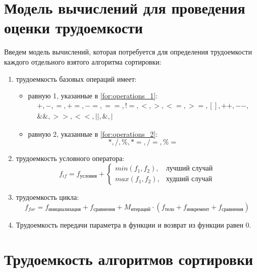 \section{Модель вычислений для проведения оценки трудоемкости}

Введем модель вычислений, которая потребуется для определения трудоемкости каждого отдельного взятого алгоритма сортировки:
\begin{enumerate}
	\item трудоемкость базовых операций имеет:
		\begin{itemize}
			\item равную 1, указанные в \ref{for:operations_1}:
			\begin{equation}
				\label{for:operations_1}
				\begin{aligned}
					+, -, =, +=, -=, ==, !=, <, >, <=, >=, [], ++, {-}-,\\
					\&\&, >>, <<, ||, \&, |
				\end{aligned}
			\end{equation}
			\item равную 2, указанные в \ref{for:operations_2}:
			\begin{equation}
				\label{for:operations_2}
				*, /, \%, *=, /=, \%=
			\end{equation}
		\end{itemize}
	\item трудоемкость условного оператора:
		\begin{equation}
			\label{for:if}
			f_{if} = f_{\text{условия}} + 
			\begin{cases}
				min(f_1, f_2), & \text{лучший случай}\\
				max(f_1, f_2), & \text{худший случай}
			\end{cases}
		\end{equation}
	\item трудоемкость цикла:
		\begin{equation}
			\label{for:for}
			f_{for} = f_{\text{инициализация}} + f_{\text{сравнения}} + M_{\text{итераций}} \cdot (f_{\text{тело}} + f_{\text{инкремент}} + f_{\text{сравнения}})
		\end{equation}
	\item Трудоемкость передачи параметра в функции и возврат из функции равен 0.
\end{enumerate}

\section{Трудоемкость алгоритмов сортировки}

